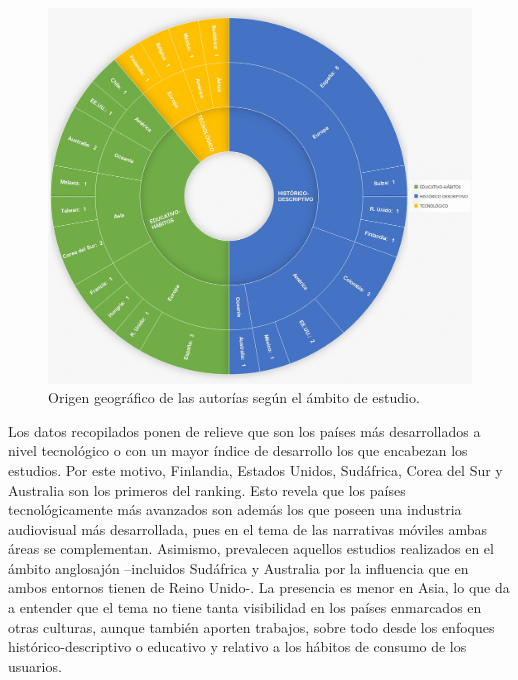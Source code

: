 \documentclass[spanish]{textolivre}
\begin{document}
 \begin{figure}[htbp]
 \centering
 \includegraphics[width=\textwidth]{fig-003[1].jpg}
 \caption{Origen geográfico de las autorías según el ámbito de estudio.}
 \label{fig3}
\end{figure}

Los datos recopilados ponen de relieve que son los países más desarrollados a nivel tecnológico o con un mayor índice de desarrollo los que encabezan los estudios. Por este motivo, Finlandia, Estados Unidos, Sudáfrica, Corea del Sur y Australia son los primeros del ranking. Esto revela que los países tecnológicamente más avanzados son además los que poseen una industria audiovisual más desarrollada, pues en el tema de las narrativas móviles ambas áreas se complementan. Asimismo, prevalecen aquellos estudios realizados en el ámbito anglosajón –incluidos Sudáfrica y Australia por la influencia que en ambos entornos tienen de Reino Unido-. La presencia es menor en Asia, lo que da a entender que el tema no tiene tanta visibilidad en los países enmarcados en otras culturas, aunque también aporten trabajos, sobre todo desde los enfoques histórico-descriptivo o educativo y relativo a los hábitos de consumo de los usuarios. 
\end{document}
